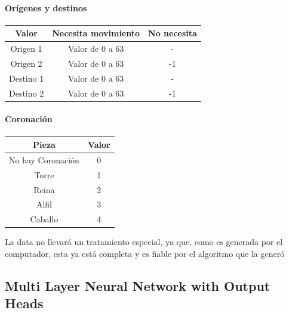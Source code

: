 \paragraph{Orígenes y destinos}
\begin{center}
\begin{tabular}{|c|c|c|}
\hline
\textbf{Valor} & \textbf{Necesita movimiento} & \textbf{No necesita} \\ \hline
Origen 1    & Valor de 0 a 63 & -\\ \hline
Origen 2    & Valor de 0 a 63 & -1\\\hline
Destino 1   & Valor de 0 a 63 & -\\\hline
Destino 2   & Valor de 0 a 63 & -1\\\hline
\end{tabular}
\end{center}
\paragraph{Coronación}
\begin{center}
    \begin{tabular}{|c|c|}
    \hline
    \textbf{Pieza} & \textbf{Valor} \\ \hline
    No hay Coronación & 0\\ \hline
    Torre  & 1 \\\hline
    Reina   & 2 \\\hline
    Alfil   & 3 \\\hline
    Caballo   & 4 \\\hline
    \end{tabular}    
\end{center}

La data no llevará un tratamiento especial, ya que, como es generada por el computador, esta ya está completa y es fiable por el algoritmo que la generó

\subsection{Multi Layer Neural Network with Output Heads}

